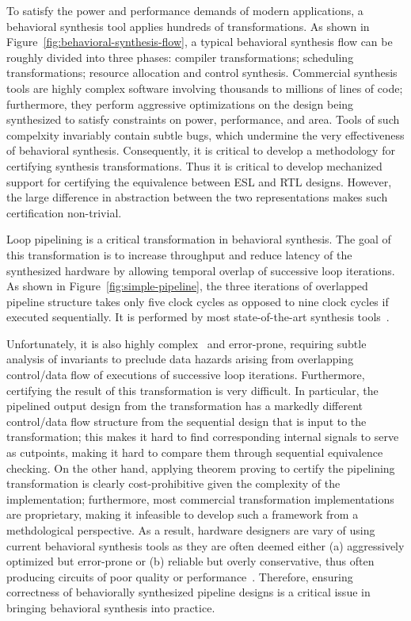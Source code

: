 To satisfy the power and performance demands
of modern applications, a behavioral synthesis tool applies
hundreds of transformations. As shown in Figure~\ref{fig:behavioral-synthesis-flow}, 
a typical behavioral synthesis flow can be roughly divided into three phases: 
compiler transformations; scheduling transformations; 
resource allocation and control synthesis. 
Commercial
synthesis tools are highly complex software involving
thousands to millions of lines of code; furthermore, they
perform aggressive optimizations on the design being
synthesized to satisfy constraints on power, performance,
and area.  Tools of such compelxity invariably contain
subtle bugs, which undermine the very effectiveness of
behavioral synthesis.  Consequently, it is critical to
develop a methodology for certifying synthesis
transformations.
Thus it is critical to develop mechanized support
for certifying the equivalence between ESL and RTL
designs. However, the large difference in
abstraction between the two representations makes such
certification non-trivial.

Loop pipelining is a critical transformation in behavioral
synthesis. The goal of this transformation is to increase
throughput and reduce latency of the synthesized hardware by
allowing temporal overlap of successive loop iterations. 
As shown in Figure~\ref{fig:simple-pipeline}, the three iterations of
overlapped pipeline structure takes only five clock cycles as opposed to 
nine clock cycles if executed sequentially.  It
is performed by most state-of-the-art 
synthesis tools~\cite{forte,vivado,legup}.

Unfortunately, it is also highly complex~\cite{tl:software-popl10} and
error-prone, requiring subtle analysis of invariants to
preclude data hazards arising from overlapping control/data flow of
executions of successive loop iterations.  Furthermore,
certifying the result of this transformation is very
difficult.  In particular, the pipelined output design from
the transformation has a markedly different control/data
flow structure from the sequential design that is input to
the transformation; this makes it hard to find corresponding
internal signals to serve as cutpoints, making it hard to
compare them through sequential equivalence checking.  On
the other hand, applying theorem proving to certify the
pipelining transformation is clearly cost-prohibitive given
the complexity of the implementation; furthermore, most
commercial transformation implementations are proprietary,
making it infeasible to develop such a framework from a
methdological perspective.
As a result, hardware designers are vary of using current behavioral synthesis tools as
they are often deemed either (a) aggressively optimized but error-prone or (b) 
reliable but overly conservative, thus often producing circuits of poor quality
or performance~\cite{spark,kundu2008}. Therefore, ensuring
correctness of behaviorally synthesized pipeline designs
is a critical issue in bringing behavioral synthesis into practice.

